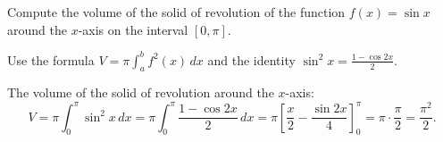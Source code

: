 
\begin{question}
Compute the volume of the solid of revolution of the function $f(x)=\sin x$ around the $x$-axis on the interval $[0,\pi]$.
\end{question}

\begin{hint}
Use the formula $V=\pi\int_a^b f^2(x)\,dx$ and the identity $\sin^2x=\frac{1-\cos2x}{2}$.
\end{hint}

\begin{solution}
The volume of the solid of revolution around the $x$-axis:
\[ V=\pi\int_0^\pi\sin^2x\,dx=\pi\int_0^\pi\frac{1-\cos2x}{2}\,dx=\pi\left[\frac x2-\frac{\sin2x}{4}\right]_0^\pi=\pi\cdot\frac\pi2=\boxed{\frac{\pi^2}{2}}. \]
\end{solution}
